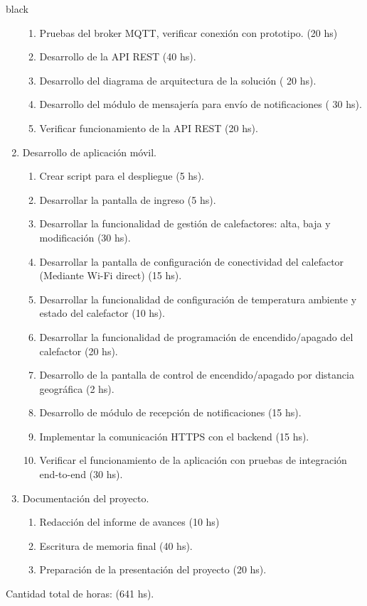 \documentclass[
11pt, %
codirector, %
]{charter}
\begin{document}
\begin{consigna}{black}
\begin{enumerate}
\begin{enumerate}
	\item Pruebas del broker MQTT, verificar conexión con prototipo. (20 hs)
	\item Desarrollo de la API REST (40 hs).
	\item Desarrollo del diagrama de arquitectura de la solución ( 20 hs).
	\item Desarrollo del módulo de mensajería para envío de notificaciones ( 30 hs).
	
	\item Verificar funcionamiento de la API REST (20 hs).
	
	\end{enumerate}
	\item Desarrollo de aplicación móvil.
	\begin{enumerate}
	
	\item Crear script para el despliegue (5 hs).
	\item Desarrollar la pantalla de ingreso (5 hs).
	\item Desarrollar la funcionalidad de gestión de calefactores: alta, baja y modificación (30 hs).
	\item Desarrollar la pantalla de configuración de conectividad del calefactor (Mediante Wi-Fi direct) (15 hs).
	\item Desarrollar la funcionalidad de configuración de temperatura ambiente y estado  del calefactor (10 hs).
	\item Desarrollar la funcionalidad de programación de encendido/apagado del calefactor (20 hs).
	\item Desarrollo de la pantalla de control de encendido/apagado por distancia geográfica (2 hs).
	\item Desarrollo de módulo de recepción de notificaciones (15 hs).
	\item Implementar la comunicación HTTPS con el backend (15 hs).
	\item Verificar el funcionamiento de la aplicación con pruebas de integración end-to-end (30 hs).
	
	\end{enumerate}
	
	\item Documentación del proyecto.
	\begin{enumerate}
	\item Redacción del informe de avances (10 hs)
	\item Escritura de memoria final (40 hs).
	\item Preparación de la presentación del proyecto (20 hs).
	\end{enumerate}
	
	
\end{enumerate}

Cantidad total de horas: (641 hs).



\end{consigna}
\pagebreak
\end{document}
